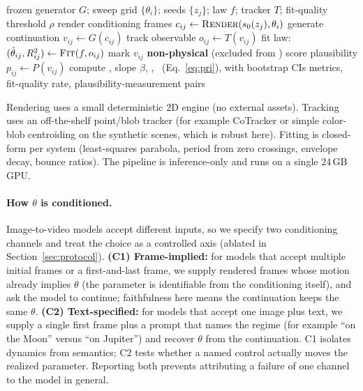 \begin{algorithm}[H]
\caption{\textsc{PhysWeep} measurement for one system and one model}
\label{alg:pipeline}
\begin{algorithmic}[1]
\Require frozen generator $G$; sweep grid $\{\theta_i\}$; seeds $\{z_j\}$;
         law $f$; tracker $T$; fit-quality threshold $\rho$
  \State render conditioning frames $c_{ij}\gets \textsc{Render}(s_0(z_j),\theta_i)$
  \State generate continuation $v_{ij}\gets G(c_{ij})$
  \State track observable $o_{ij}\gets T(v_{ij})$
  \State fit law: $(\hat{\theta}_{ij}, R^2_{ij})\gets \textsc{Fit}(f, o_{ij})$
   \State mark $v_{ij}$ \textbf{non-physical} (excluded from \PRE) \EndIf
  \State score plausibility $p_{ij}\gets P(v_{ij})$ 
\EndFor
\State compute \PRE, slope $\beta$, \EG, \PRI\ (Eq.~\ref{eq:pri}), with bootstrap CIs
\State \Return metrics, fit-quality rate, plausibility-measurement pairs
\end{algorithmic}
\end{algorithm}

Rendering uses a small deterministic 2D engine (no external assets). Tracking
uses an off-the-shelf point/blob tracker (for example CoTracker
\citep{karaev2023cotracker} or simple color-blob centroiding on the synthetic
scenes, which is robust here). Fitting is closed-form per system
(least-squares parabola, period from zero crossings, envelope decay, bounce
ratios). The pipeline is inference-only and runs on a single 24\,GB GPU.

\paragraph{How $\theta$ is conditioned.}
Image-to-video models accept different inputs, so we specify two conditioning
channels and treat the choice as a controlled axis (ablated in
Section~\ref{sec:protocol}). \textbf{(C1) Frame-implied:} for models that accept
multiple initial frames or a first-and-last frame, we supply rendered frames
whose motion already implies $\theta$ (the parameter is identifiable from the
conditioning itself), and ask the model to continue; faithfulness here means the
continuation keeps the same $\theta$. \textbf{(C2) Text-specified:} for models
that accept one image plus text, we supply a single first frame plus a prompt
that names the regime (for example ``on the Moon'' versus ``on Jupiter'') and
recover $\theta$ from the continuation. C1 isolates dynamics from semantics; C2
tests whether a named control actually moves the realized parameter. Reporting
both prevents attributing a failure of one channel to the model in general.


